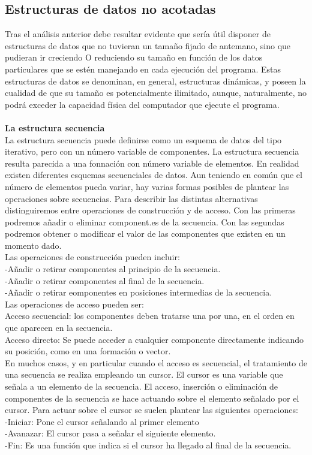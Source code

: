 \documentclass[11pt,a4paper]{article}
\begin{document}
  	\subsection{Estructuras de datos no acotadas}
  	Tras el análisis anterior debe resultar evidente que sería útil disponer de estructuras de datos que no tuvieran un tamaño fijado de antemano, sino que pudieran ir creciendo O reduciendo su tamaño en función de los datos particulares
  	que se estén manejando en cada ejecución del programa. Estas estructuras de datos se denominan, en general, estructuras dinámicas, y poseen la cualidad
  	de que su tamaño es potencialmente ilimitado, aunque, naturalmente, no
  	podrá exceder la capacidad física del computador que ejecute el programa. \\
  	\\
  	\textbf{La estructura secuencia}\\
  	La estructura secuencia puede definirse como un esquema de datos del tipo iterativo, pero con un número variable de componentes. La estructura secuencia resulta parecida a una fonnación con número variable de elementos.
  	En realidad existen diferentes esquemas secuenciales de datos. Aun teniendo en común que el número de elementos pueda variar, hay varias formas posibles de plantear las operaciones sobre secuencias. Para describir las distintas alternativas
  	distinguiremos entre operaciones de construcción y de acceso. Con
  	las primeras podremos añadir o eliminar component.es de la secuencia. Con
  	las segundas podremos obtener o modificar el valor de las componentes que
  	existen en un momento dado.\\
  	Las operaciones de construcción pueden incluir:\\
  	-Añadir o retirar componentes al principio de la secuencia.\\
  	-Añadir o retirar componentes al final de la secuencia.\\
  	-Añadir o retirar eomponentes en posiciones intermedias de la secuencia.\\
  	Las operaciones de acceso pueden ser:\\
  	Acceso secuencial: los componentes deben tratarse una por una, en el orden en que aparecen en la secuencia.\\
  	Acceso directo: Se puede acceder a cualquier componente directamente indicando su posición, como en una formación o vector.\\
  	En muchos casos, y en particular cuando el acceso es secuencial, el tratamiento de una secuencia se realiza empleando un cursor. El cursor es una variable que señala a un elemento de la secuencia. El acceso, inserción o eliminación de
  	componentes de la secuencia se hace actuando sobre el elemento señalado por el cursor. Para actuar sobre el cursor se suelen plantear
  	las siguientes operaciones:\\
  	-Iniciar: Pone el cursor señalando al primer elemento\\
  	-Avanazar: El cursor pasa a señalar el siguiente elemento.\\
  	-Fin: Es una función que indica si el cursor ha llegado al final de la secuencia.
\end{document}

